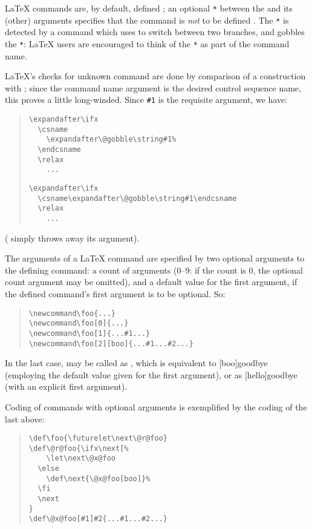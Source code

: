 \LaTeX{} commands are, by default, defined ; an optional \texttt{*}
between the  and its (other) arguments specifies that
the command is \emph{not} to be defined .  The \texttt{*} is
detected by a command  which uses  to switch
between two branches, and gobbles the \texttt{*}: \LaTeX{} users are
encouraged to think of the \texttt{*} as part of the command name.

\LaTeX{}'s checks for unknown command are done by  comparison
of a  construction with ; since the command name
argument is the desired control sequence name, this proves a little
long-winded.  Since \texttt{\#1} is the requisite argument, we have:
\begin{quote}
\begin{narrowversion}
\begin{verbatim}
\expandafter\ifx
  \csname
    \expandafter\@gobble\string#1%
  \endcsname
  \relax
    ...
\end{verbatim}
\end{narrowversion}
\begin{wideversion}
\begin{verbatim}
\expandafter\ifx
  \csname\expandafter\@gobble\string#1\endcsname
  \relax
    ...
\end{verbatim}
\end{wideversion}
\end{quote}
( simply throws away its argument).

The arguments of a \LaTeX{} command are specified by two optional
arguments to the defining command: a count of arguments (0--9: if the
count is 0, the optional count argument may be omitted), and a default
value for the first argument, if the defined command's first argument
is to be optional.  So:
\begin{quote}
\begin{verbatim}
\newcommand\foo{...}
\newcommand\foo[0]{...}
\newcommand\foo[1]{...#1...}
\newcommand\foo[2][boo]{...#1...#2...}
\end{verbatim}
\end{quote}
In the last case,  may be called as ,
which is equivalent to [boo]{goodbye} (employing the
default value given for the first argument), or as
[hello]{goodbye} (with an explicit first argument).

Coding of commands with optional arguments is exemplified by the
coding of the last  above:
\begin{quote}
\begin{verbatim}
\def\foo{\futurelet\next\@r@foo}
\def\@r@foo{\ifx\next[%
    \let\next\@x@foo
  \else
    \def\next{\@x@foo[boo]}%
  \fi
  \next
}
\def\@x@foo[#1]#2{...#1...#2...}
\end{verbatim}
\end{quote}

